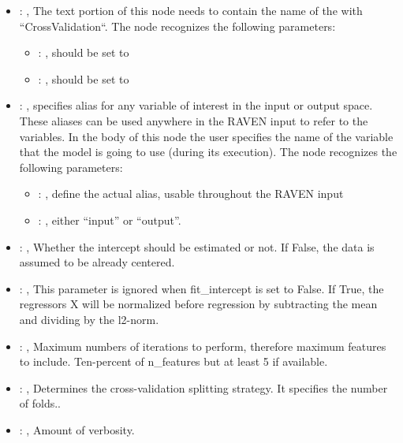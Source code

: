 \begin{itemize}
    \item {}: , 
      The text portion of this node needs to contain the name of the  with
               ``CrossValidation``.
      The  node recognizes the following parameters:
        \begin{itemize}
          \item {}: , 
            should be set to 
          \item {}: , 
            should be set to 
      \end{itemize}

    \item {}: , 
      specifies alias for         any variable of interest in the input or output space. These
      aliases can be used anywhere in the RAVEN input to         refer to the variables. In the body
      of this node the user specifies the name of the variable that the model is going to use
      (during its execution).
      The  node recognizes the following parameters:
        \begin{itemize}
          \item {}: , 
            define the actual alias, usable throughout the RAVEN input
          \item {}: , 
            either ``input'' or ``output''.
      \end{itemize}

    \item {}: , 
      Whether the intercept should be estimated or not. If False,
      the data is assumed to be already centered.

    \item {}: , 
      This parameter is ignored when fit\_intercept is set to False. If True,
      the regressors X will be normalized before regression by subtracting the mean and
      dividing by the l2-norm.

    \item {}: , 
      Maximum numbers of iterations to perform, therefore maximum
      features to include. Ten-percent of n\_features but at least 5 if available.

    \item {}: , 
      Determines the cross-validation splitting strategy.
      It specifies the number of folds..

    \item {}: , 
      Amount of verbosity.
  \end{itemize}



